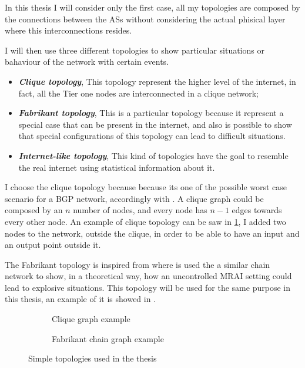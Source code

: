 In this thesis I will consider only the first case, all my topologies are composed by
the connections between the \acp{AS} without considering the actual phisical layer
where this interconnections resides.

I will then use three different topologies to show particular situations or 
bahaviour of the network with certain events.
\begin{itemize}
	\item \textbf{\textit{Clique topology}}, This topology represent the higher
		level of the internet, in fact, all the Tier one nodes are interconnected
		in a clique network;
	\item \textbf{\textit{Fabrikant topology}}, This is a particular topology
		because it represent a special case that can be present in the internet,
		and also is possible to show that special configurations of this topology
		can lead to difficult situations.
	\item \textbf{\textit{Internet-like topology}}, This kind of topologies
		have the goal to resemble the real internet using statistical information
		about it.
\end{itemize}

I choose the clique topology because because its one of the possible worst
case scenario for a \ac{BGP} network, accordingly with \cite{labovitz2000delayed}.
A clique graph could be composed by an $n$ number of nodes, and every node has
$n-1$ edges towards every other node.
An example of clique topology can be saw in \cref{fig:clique_topology}, I added
two nodes to the network, outside the clique, in order to be able to have an
input and an output point outside it.

The Fabrikant topology is inspired from \cite{fabrikant2011there} where is used
the a similar chain network to show, in a theoretical way, how an uncontrolled
\ac{MRAI} setting could lead to explosive situations.
This topology will be used for the same purpose in this thesis, an example
of it is showed in .

\begin{figure}[h]
     \centering
     \begin{subfigure}[b]{0.45\textwidth}
         \centering
		 
		 \caption{Clique graph example}
    	 \label{fig:clique_topology}
     \end{subfigure}
     \hfill
     \begin{subfigure}[b]{0.45\textwidth}
         \centering
         
		 \caption{Fabrikant chain graph example}
		 \label{fig:fabrikant_topology}
     \end{subfigure}
		\caption{Simple topologies used in the thesis}
        \label{fig:clique_and_fabrikant}
\end{figure}

